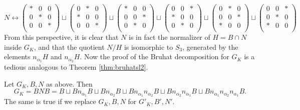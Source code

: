 \begin{equation*}
    N\longleftrightarrow\begin{pmatrix}
        * & 0 & 0\\
        0 & * & 0\\
        0 & 0 & *\\
    \end{pmatrix}\sqcup\begin{pmatrix}
        0 & * & 0\\
        * & 0 & 0\\
        0 & 0 & *\\
    \end{pmatrix}\sqcup\begin{pmatrix}
        * & 0 & 0\\
        0 & 0 & *\\
        0 & * & 0\\
    \end{pmatrix}\sqcup\begin{pmatrix}
        0 & 0 & *\\
        * & 0 & 0\\
        0 & * & 0\\
    \end{pmatrix}\sqcup\begin{pmatrix}
        0 & * & 0\\
        0 & 0 & *\\
        * & 0 & 0\\
    \end{pmatrix}\sqcup\begin{pmatrix}
        0 & 0 & *\\
        0 & * & 0\\
        * & 0 & 0\\
    \end{pmatrix}
\end{equation*}
From this perspective, it is clear that $N$ is in fact the normalizer of $H=B\cap N$ inside $G_K$, and that the quotient $N/H$ is isomorphic to $S_3$, generated by the elements $n_{\alpha_1}H$ and $n_{\alpha_2}H$. Now the proof of the Bruhat decomposition for $G_K$ is a tedious analogous to Theorem \ref{thm:bruhatsl2}.

\begin{theorem} 
    Let $G_K,B,N$ as above. Then 
    $$G_K=BNB=B\sqcup Bn_{\alpha_1}B\sqcup Bn_{\alpha_2}B\sqcup Bn_{\alpha_1}n_{\alpha_2}B\sqcup Bn_{\alpha_2}n_{\alpha_1}B\sqcup Bn_{\alpha_1}n_{\alpha_2}n_{\alpha_1}B.$$  
    The same is true if we replace $G_K,B,N$ for $G'_K,B',N'$.
\end{theorem}




